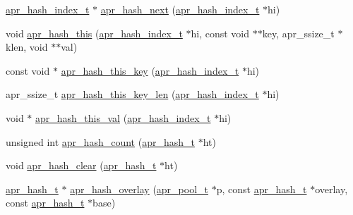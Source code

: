 \begin{DoxyCompactItemize}
\item 
\hyperlink{group__apr__hash_ga3b3d353989f6cea4535630634be147f7}{apr\+\_\+hash\+\_\+index\+\_\+t} $\ast$ \hyperlink{group__apr__hash_ga9d7b9198555659e9abac4e3028ccce00}{apr\+\_\+hash\+\_\+next} (\hyperlink{group__apr__hash_ga3b3d353989f6cea4535630634be147f7}{apr\+\_\+hash\+\_\+index\+\_\+t} $\ast$hi)
\item 
void \hyperlink{group__apr__hash_gad90e5b895397c2c535e32b3e44a75b3f}{apr\+\_\+hash\+\_\+this} (\hyperlink{group__apr__hash_ga3b3d353989f6cea4535630634be147f7}{apr\+\_\+hash\+\_\+index\+\_\+t} $\ast$hi, const void $\ast$$\ast$key, apr\+\_\+ssize\+\_\+t $\ast$klen, void $\ast$$\ast$val)
\item 
const void $\ast$ \hyperlink{group__apr__hash_ga835bd602131de7d40cbf8abd4e0f9f6c}{apr\+\_\+hash\+\_\+this\+\_\+key} (\hyperlink{group__apr__hash_ga3b3d353989f6cea4535630634be147f7}{apr\+\_\+hash\+\_\+index\+\_\+t} $\ast$hi)
\item 
apr\+\_\+ssize\+\_\+t \hyperlink{group__apr__hash_gae49a862095e9a3ca96603faa69493736}{apr\+\_\+hash\+\_\+this\+\_\+key\+\_\+len} (\hyperlink{group__apr__hash_ga3b3d353989f6cea4535630634be147f7}{apr\+\_\+hash\+\_\+index\+\_\+t} $\ast$hi)
\item 
void $\ast$ \hyperlink{group__apr__hash_gaebf56aa7585e6fa18b6ff9563c71914b}{apr\+\_\+hash\+\_\+this\+\_\+val} (\hyperlink{group__apr__hash_ga3b3d353989f6cea4535630634be147f7}{apr\+\_\+hash\+\_\+index\+\_\+t} $\ast$hi)
\item 
unsigned int \hyperlink{group__apr__hash_ga4e44efa9ef043c1bb8a4abc5edcfda2c}{apr\+\_\+hash\+\_\+count} (\hyperlink{group__apr__hash_ga72ec09b8bde6d874c36bd49df915fff6}{apr\+\_\+hash\+\_\+t} $\ast$ht)
\item 
void \hyperlink{group__apr__hash_ga06fb1b9ecff1a15ee41ff02db74264e4}{apr\+\_\+hash\+\_\+clear} (\hyperlink{group__apr__hash_ga72ec09b8bde6d874c36bd49df915fff6}{apr\+\_\+hash\+\_\+t} $\ast$ht)
\item 
\hyperlink{group__apr__hash_ga72ec09b8bde6d874c36bd49df915fff6}{apr\+\_\+hash\+\_\+t} $\ast$ \hyperlink{group__apr__hash_ga2f68646a64bad44efcbf3457af581fdb}{apr\+\_\+hash\+\_\+overlay} (\hyperlink{group__apr__pools_gaf137f28edcf9a086cd6bc36c20d7cdfb}{apr\+\_\+pool\+\_\+t} $\ast$p, const \hyperlink{group__apr__hash_ga72ec09b8bde6d874c36bd49df915fff6}{apr\+\_\+hash\+\_\+t} $\ast$overlay, const \hyperlink{group__apr__hash_ga72ec09b8bde6d874c36bd49df915fff6}{apr\+\_\+hash\+\_\+t} $\ast$base)
\item 

\end{DoxyCompactItemize}
